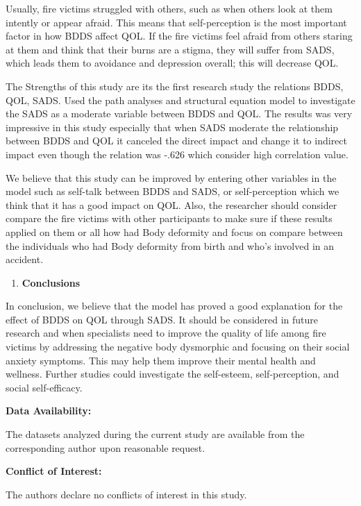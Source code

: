 \documentclass[
]{article}
\begin{document}
Usually, fire victims struggled with others, such as when others look at
them intently or appear afraid. This means that self-perception is the
most important factor in how BDDS affect QOL. If the fire victims feel
afraid from others staring at them and think that their burns are a
stigma, they will suffer from SADS, which leads them to avoidance and
depression overall; this will decrease QOL.

The Strengths of this study are its the first research study the
relations BDDS, QOL, SADS. Used the path analyses and structural
equation model to investigate the SADS as a moderate variable between
BDDS and QOL. The results was very impressive in this study especially
that when SADS moderate the relationship between BDDS and QOL it
canceled the direct impact and change it to indirect impact even though
the relation was -.626 which consider high correlation value.

We believe that this study can be improved by entering other variables
in the model such as self-talk between BDDS and SADS, or self-perception
which we think that it has a good impact on QOL. Also, the researcher
should consider compare the fire victims with other participants to make
sure if these results applied on them or all how had Body deformity and
focus on compare between the individuals who had Body deformity from
birth and who's involved in an accident.

\begin{enumerate}
\def\labelenumi{\arabic{enumi}.}
\setcounter{enumi}{4}
\item
  \textbf{Conclusions}
\end{enumerate}

In conclusion, we believe that the model has proved a good explanation
for the effect of BDDS on QOL through SADS. It should be considered in
future research and when specialists need to improve the quality of life
among fire victims by addressing the negative body dysmorphic and
focusing on their social anxiety symptoms. This may help them improve
their mental health and wellness. Further studies could investigate the
self-esteem, self-perception, and social self-efficacy.

\textbf{Data Availability:}

The datasets analyzed during the current study are available from the
corresponding author upon reasonable request.

\textbf{Conflict of Interest:}

The authors declare no conflicts of interest in this study.
\end{document}
